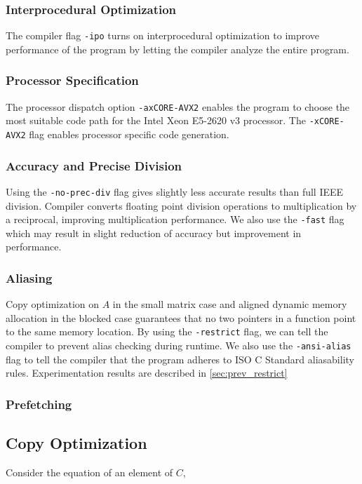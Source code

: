 \documentclass[11pt]{article}
\begin{document}
\subsubsection{Interprocedural Optimization}
The compiler flag \texttt{-ipo} turns on interprocedural optimization to improve performance of the program by letting the compiler analyze the entire program. \cite{ipo}

\subsubsection{Processor Specification}
The processor dispatch option \texttt{-axCORE-AVX2} enables the program to choose the most suitable code path for the Intel Xeon E5-2620 v3 processor. The \texttt{-xCORE-AVX2} flag enables processor specific code generation. \cite{comp_opt}


\subsubsection{Accuracy and Precise Division}
Using the \texttt{-no-prec-div} flag gives slightly less accurate results than full IEEE division. Compiler converts floating point division operations to multiplication by a reciprocal, improving multiplication performance. We also use the \texttt{-fast} flag which may result in slight reduction of accuracy but improvement in performance. 

\subsubsection{Aliasing}

Copy optimization on $A$ in the small matrix case and aligned dynamic memory allocation in the blocked case guarantees that no two pointers in a function point to the same memory location. By using the \texttt{-restrict} flag, we can tell the compiler to prevent alias checking during runtime. \cite{opt} We also use the \texttt{-ansi-alias} flag to tell the compiler that the program adheres to ISO C Standard aliasability rules. Experimentation results are described in \ref{sec:prev_restrict}

\subsubsection{Prefetching}


\subsection{Copy Optimization}\label{sec:copy_opt}
Consider the equation of an element of $C$,
\end{document}

